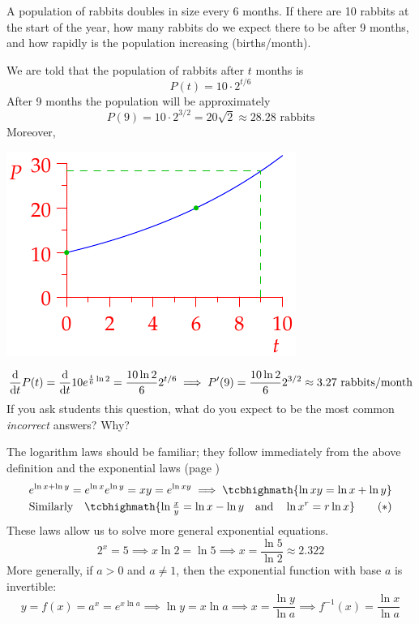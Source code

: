 \begin{example}{}{}
	A population of rabbits doubles in size every 6 months. If there are 10 rabbits at the start of the year, how many rabbits do we expect there to be after 9 months, and how rapidly is the population increasing (births/month).\par
	\begin{minipage}[t]{0.6\linewidth}\vspace{-3pt}
	  We are told that the population of rabbits after $t$ months is
	  \[
	  	P(t)=10\cdot 2^{t/6}
	  \]
	  After 9 months the population will be approximately
	  \[
	  	P(9)=10\cdot 2^{3/2}=20\sqrt 2\approx 28.28\text{ rabbits}
	  \]
	  Moreover,
	  \end{minipage}
	  \hfill
	  \begin{minipage}[t]{0.39\linewidth}\vspace{-10pt}
	  	\flushright\includegraphics{rabbits}
	  \end{minipage}\par\vspace{-3pt}
	  \[
	  	\frac{\mathrm{d} }{\mathrm{d} t}P(t)=\frac{\mathrm{d} }{\mathrm{d} t}10e^{\frac t6\ln 2}=\frac{10\ln 2} 62^{t/6}
	  	\implies P'(9)=\frac{10\ln 2}62^{3/2}\approx 3.27\text{ rabbits/month}
	  \]
	  If you ask students this question, what do you expect to be the most common \emph{incorrect} answers? Why?
\end{example}


\goodbreak



The logarithm laws should be familiar; they follow immediately from the above definition and the exponential laws (page \pageref{pg:explaws})
\begin{gather*}
	e^{\ln x+\ln y}=e^{\ln x}e^{\ln y}=xy=e^{\ln xy}\implies \tcbhighmath{\ln xy=\ln x+\ln y}\\
	\text{Similarly}\quad \tcbhighmath{\ln\tfrac xy=\ln x-\ln y\quad\text{and}\quad \ln x^r=r\ln x}\tag{$\ast$}
\end{gather*}
These laws allow us to solve more general exponential equations.
\[
	2^{x}=5\implies x\ln 2=\ln 5\implies x=\frac{\ln 5}{\ln 2}\approx 2.322
\]
More generally, if $a>0$ and $a\neq 1$, then the exponential function with base $a$ is invertible:
\[
	y=f(x)=a^x=e^{x\ln a}\implies \ln y=x\ln a\implies x=\frac{\ln y}{\ln a}\implies f^{-1}(x)=\frac{\ln x}{\ln a}
\]

